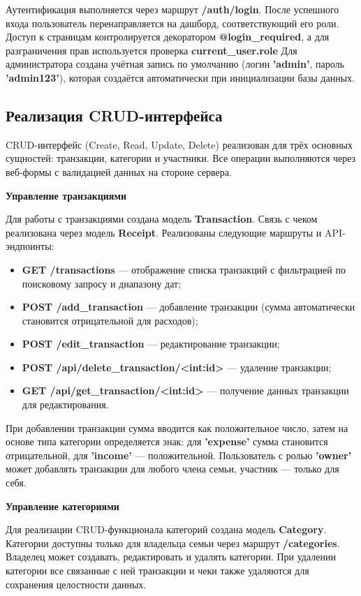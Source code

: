 Аутентификация выполняется через маршрут \textbf{/auth/login}. После успешного входа пользователь перенаправляется на дашборд, соответствующий его роли. 
Доступ к страницам контролируется декоратором \textbf{@login\_required}, а для разграничения прав используется проверка \textbf{current\_user.role}
Для администратора создана учётная запись по умолчанию (логин \textbf{'admin'}, пароль \textbf{'admin123'}), которая создаётся автоматически при инициализации базы данных.


\subsection{Реализация CRUD-интерфейса}

CRUD-интерфейс (Create, Read, Update, Delete) реализован для трёх основных сущностей: транзакции, категории и участники. Все операции выполняются через веб-формы с валидацией данных на стороне сервера.

\textbf{Управление транзакциями}

Для работы с транзакциями создана модель \textbf{Transaction}. Связь с чеком реализована через модель \textbf{Receipt}. Реализованы следующие маршруты и API-эндпоинты:
\begin{itemize}
    \item \textbf{GET /transactions} --- отображение списка транзакций с фильтрацией по поисковому запросу и диапазону дат;
    \item \textbf{POST /add\_transaction} --- добавление транзакции (сумма автоматически становится отрицательной для расходов);
    \item \textbf{POST /edit\_transaction} --- редактирование транзакции;
    \item \textbf{POST /api/delete\_transaction/<int:id>} --- удаление транзакции;
    \item \textbf{GET /api/get\_transaction/<int:id>} --- получение данных транзакции для редактирования.
\end{itemize}

При добавлении транзакции сумма вводится как положительное число, затем на основе типа категории определяется знак: для \textbf{'expense'} сумма становится отрицательной, для \textbf{'income'} --- положительной. Пользователь с ролью \textbf{'owner'} может добавлять транзакции для любого члена семьи, участник --- только для себя.

\textbf{Управление категориями}

Для реализации CRUD-функционала категорий создана модель \textbf{Category}. Категории доступны только для владельца семьи через маршрут \textbf{/categories}. Владелец может создавать, редактировать и удалять категории. При удалении категории все связанные с ней транзакции и чеки также удаляются для сохранения целостности данных.

